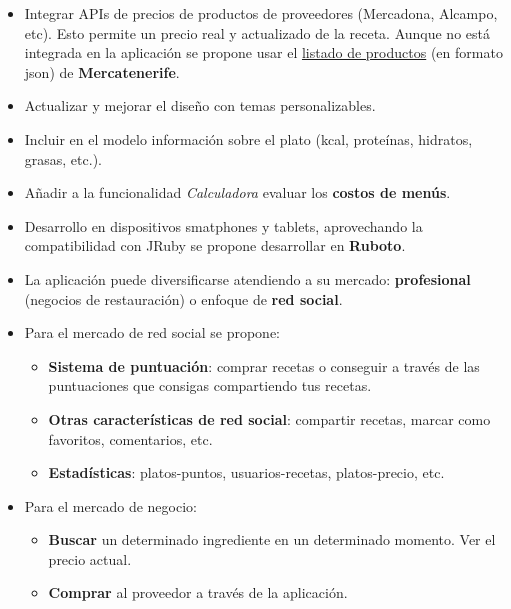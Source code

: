 \begin{itemize}
\item Integrar APIs de precios de productos de proveedores (Mercadona, Alcampo, etc). Esto permite un precio real y actualizado de la receta. Aunque no está integrada en la aplicación se propone usar el \href{http://www.opendatacanarias.es/datos/dataset/mercatenerife-precios-de-productos-hortofruticolas-de-tenerife}{listado de productos} (en formato json) de \textbf{Mercatenerife}.

\item Actualizar y mejorar el diseño con temas personalizables.
\item Incluir en el modelo información sobre el plato (kcal, proteínas, hidratos, grasas, etc.).
\item Añadir a la funcionalidad \emph{Calculadora} evaluar los \textbf{costos de menús}.
\item Desarrollo en dispositivos smatphones y tablets, aprovechando la compatibilidad con JRuby se propone desarrollar en \textbf{Ruboto}.

\item La aplicación puede diversificarse atendiendo a su mercado: \textbf{profesional} (negocios de restauración) o enfoque de \textbf{red social}.
	\item Para el mercado de red social se propone:
		\begin{itemize}
			\item \textbf{Sistema de puntuación}: comprar recetas o conseguir a través de las puntuaciones que consigas compartiendo tus recetas.
			\item \textbf{Otras características de red social}: compartir recetas, marcar como favoritos, comentarios, etc.
			\item \textbf{Estadísticas}: platos-puntos, usuarios-recetas, platos-precio, etc.
		\end{itemize}
	\item Para el mercado de negocio:
		\begin{itemize}
			\item \textbf{Buscar} un determinado ingrediente en un determinado momento. Ver el precio actual.
			\item \textbf{Comprar} al proveedor a través de la aplicación.
		\end{itemize}

\end{itemize}
